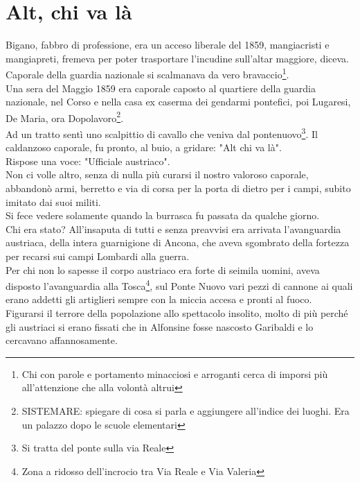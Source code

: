 \documentclass[10pt]{memoir} %
\begin{document}
\chapter{Alt, chi va là}
Bigano, fabbro di professione, era un acceso liberale del 1859, mangiacristi e mangiapreti, fremeva per poter trasportare l'incudine sull'altar maggiore, diceva. Caporale della guardia nazionale si scalmanava da vero bravaccio\footnote{Chi con parole e portamento minacciosi e arroganti cerca di imporsi più all'attenzione che alla volontà altrui}.\\
Una sera del Maggio 1859 era caporale caposto al quartiere della guardia nazionale, nel Corso e nella casa ex caserma dei gendarmi pontefici, poi Lugaresi, De Maria, ora Dopolavoro\footnote{SISTEMARE: spiegare di cosa si parla e aggiungere all'indice dei luoghi. Era un palazzo dopo le scuole elementari}.\\Ad un tratto sentì uno scalpittio di cavallo che veniva dal pontenuovo\footnote{Si tratta del ponte sulla via Reale}. Il caldanzoso caporale, fu pronto, al buio, a gridare: "Alt chi va là".\\
Rispose una voce: "Ufficiale austriaco".\\
Non ci volle altro, senza di nulla più curarsi il nostro valoroso caporale, abbandonò armi, berretto e via di corsa per la porta di dietro per i campi, subito imitato dai suoi militi.\\
Si fece vedere solamente quando la burrasca fu passata da qualche giorno.\\
Chi era stato? All'insaputa di tutti e senza preavvisi era arrivata l'avanguardia austriaca, della intera guarnigione di Ancona, che aveva sgombrato della fortezza per recarsi sui campi Lombardi alla guerra.\\
Per chi non lo sapesse il corpo austriaco era forte di seimila uomini, aveva disposto l'avanguardia alla Tosca\footnote{Zona a ridosso dell'incrocio tra Via Reale e Via Valeria}, sul Ponte Nuovo vari pezzi di cannone ai quali erano addetti gli artiglieri sempre con la miccia accesa e pronti al fuoco.\\
Figurarsi il terrore della popolazione allo spettacolo insolito, molto di più perché gli austriaci si erano fissati che in Alfonsine fosse nascosto Garibaldi e lo cercavano affannosamente. \\
\end{document}
